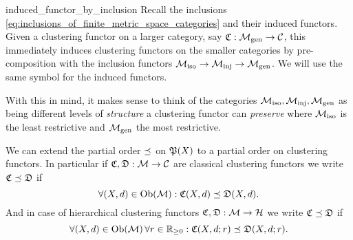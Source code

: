 \begin{myremark}{}{induced_functor_by_inclusion}
Recall the inclusions \eqref{eq:inclusions_of_finite_metric_space_categories} and their induced functors.
Given a clustering functor on a larger category, say $\Cf: \gen \to \C$, this immediately induces clustering functors on the smaller categories by pre-composition with the inclusion functors $\iso \to \inj \to \gen$. We will use the same symbol for the induced functors.
\end{myremark}

With this in mind, it makes sense to think of the categories $\iso, \inj, \gen$ as being different levels of \emph{structure} a clustering functor can \emph{preserve} where $\iso$ is the least restrictive and $\gen$ the most restrictive.


\begin{myremark}{}{}
We can extend the partial order $\refines$ on $\P(X)$ to a partial order on clustering functors.
In particular if $\Cf, \mathfrak{D}: \M \to \C$ are classical clustering functors we write $\Cf \refines \mathfrak{D}$ if
\begin{equation*}
    \forall (X,d) \in \ob(\M): \Cf(X,d) \refines \mathfrak{D}(X,d).
\end{equation*}
And in case of hierarchical clustering functors $\Cf, \mathfrak{D}: \M \to \H$ we write $\Cf \refines \mathfrak{D}$ if
\begin{equation*}
    \forall (X,d) \in \ob(\M) \, \forall r \in \R_{\geq0}: \Cf(X,d;r) \refines \mathfrak{D}(X,d;r).
\end{equation*}
\end{myremark}